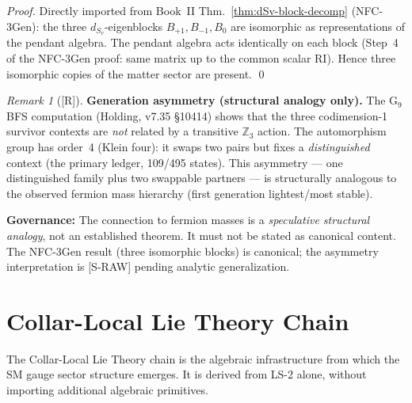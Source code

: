 \documentclass[12pt,oneside]{amsbook}
\theoremstyle{plain}
\theoremstyle{definition}
\theoremstyle{remark}
\newtheorem{remark}[theorem]{Remark}
\newcommand{\status}[1]{\textup{[#1]}}
\begin{document}
\begin{proof}
Directly imported from Book~II Thm.~\ref{thm:dSv-block-decomp}
(NFC-3Gen): the three $d_{S_v}$-eigenblocks $B_{+1}, B_{-1}, B_0$
are isomorphic as representations of the pendant algebra.
The pendant algebra acts identically on each block (Step~4 of
the NFC-3Gen proof: same matrix up to the common scalar $\mathrm{RI}$).
Hence three isomorphic copies of the matter sector are present. \qed
\end{proof}

\begin{remark}[\status{R}]\label{rem:three-gen-asymmetry}
\textbf{Generation asymmetry (structural analogy only).}
The G$_9$ BFS computation (Holding, v7.35 §10414) shows that the
three codimension-1 survivor contexts are \emph{not} related by a
transitive $\mathbb{Z}_3$ action. The automorphism group has
order~4 (Klein four): it swaps two pairs but fixes a
\emph{distinguished} context (the primary ledger, 109/495 states).
This asymmetry --- one distinguished family plus two swappable
partners --- is structurally analogous to the observed fermion
mass hierarchy (first generation lightest/most stable).

\textbf{Governance:} The connection to fermion masses is a
\emph{speculative structural analogy}, not an established theorem.
It must not be stated as canonical content. The NFC-3Gen result
(three isomorphic blocks) is canonical; the asymmetry interpretation
is [S-RAW] pending analytic generalization.
\end{remark}

\section{Collar-Local Lie Theory Chain}
\label{sec:sm-collar-lie}

The Collar-Local Lie Theory chain is the algebraic infrastructure
from which the SM gauge sector structure emerges. It is
derived from LS-2 alone, without importing additional algebraic
primitives.
\end{document}
